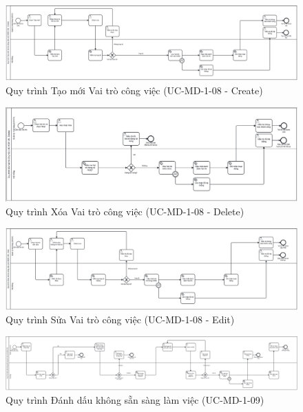 \begin{figure}[H]
	\centering
	\includegraphics[width=15cm]{Sections/tong_quan/functional_spec/img/1.8.1.png}

     \vspace{0.5cm}
    \caption{Quy trình Tạo mới Vai trò công việc (UC-MD-1-08 - Create)}
\end{figure}
\begin{figure}[H]
	\centering
	\includegraphics[width=15cm]{Sections/tong_quan/functional_spec/img/1.8.2.png}

     \vspace{0.5cm}
    \caption{Quy trình Xóa Vai trò công việc (UC-MD-1-08 - Delete)}
\end{figure}
\begin{figure}[H]
	\centering
	\includegraphics[width=15cm]{Sections/tong_quan/functional_spec/img/1.8.3.png}

     \vspace{0.5cm}
    \caption{Quy trình Sửa Vai trò công việc (UC-MD-1-08 - Edit)}
\end{figure}


\begin{figure}[H]
	\centering
	\includegraphics[width=15cm]{Sections/tong_quan/functional_spec/img/1.9.png}

     \vspace{0.5cm}
    \caption{Quy trình Đánh dấu không sẵn sàng làm việc (UC-MD-1-09)}
\end{figure}

